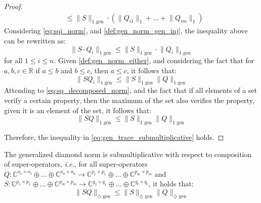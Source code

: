 \begin{proof}
\begin{equation}
\begin{split}
    &  \leq  \lVert S  \rVert_{1 \text{ gen}} \cdot (\lVert Q_{i1} \rVert_{1} + \ldots + \lVert Q_{im} \rVert_{1})
    \end{split}
  \end{equation}
  Considering \autoref{eq:sqi_norm}, and \autoref{def:gen_norm_gen_inj}, the inequality above can be rewritten as: 
  \begin{equation}
     \lVert S \cdot  Q_i \rVert_{1 \text{ gen}} \leq \lVert S  \rVert_{1 \text{ gen}} \cdot \lVert Q_i  \rVert_{1 \text{ gen}}
  \end{equation}
  for all $1 \leq i \leq n$. Given \autoref{def:gen_norm_either}, and considering the fact that for $a,b,c \in \mathbb{R}$ if $a \leq b$ and $b \leq c$, then $a \leq c$, it follows that:
  \begin{equation}
    \lVert S  Q_i \rVert_{1 \text{ gen}} \leq \lVert S \rVert_{1 \text{ gen}} \lVert Q \rVert_{1 \text{ gen}}
  \end{equation}
  Attending to \autoref{eq:sq_decomposed_norm}, and the fact that if all elements of a set verify a certain property, then the maximum of the set also verifies the property, given it is an element of the set, it follows that:
  \begin{equation}
    \lVert S  Q \rVert_{1 \text{ gen}} \leq \lVert S \rVert_{1 \text{ gen}} \lVert Q \rVert_{1 \text{ gen}}
  \end{equation}
  
  Therefore, the inequality in \autoref{eq:gen_trace_submultiplicative} holds.
  
  
  
  \end{proof}
  
  
  \begin{lemma}\label{lem:gen_diamond_submultiplicative}
    The generalized diamond norm is submultiplicative with respect to composition of super‑operators, \textit{i.e.}, for all super-operators $Q: \mathbb{C}^{o_1 \times o_1} \oplus \ldots \oplus \mathbb{C}^{o_n \times o_n}  \rightarrow \mathbb{C}^{p_1 \times p_1} \oplus \ldots \oplus  \mathbb{C}^{p_m \times p_m}$ and $S: \mathbb{C}^{p_1 \times p_1} \oplus \ldots \oplus \mathbb{C}^{p_m \times p_m}  \rightarrow \mathbb{C}^{q_1 \times q_1} \oplus \ldots \oplus \mathbb{C}^{q_t \times q_t}$, it holds that:
    \begin{equation} \label{eq:gen_trace_submultiplicative}
      \lVert S  Q \rVert_{\diamondsuit \text{ gen}} \leq \lVert S \rVert_{\diamondsuit  \text{ gen}} \lVert Q \rVert_{\diamondsuit  \text{ gen}}
    \end{equation}
  \end{lemma}
  
